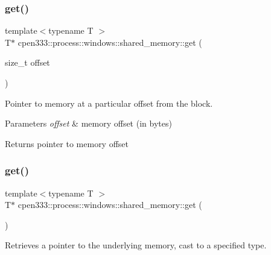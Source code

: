 \subsubsection{\texorpdfstring{get()}{get()}\hspace{0.1cm}{\footnotesize\ttfamily [2/3]}}
{\footnotesize\ttfamily template$<$typename T $>$ \\
T$\ast$ cpen333\+::process\+::windows\+::shared\+\_\+memory\+::get (\begin{DoxyParamCaption}\item[{size\+\_\+t}]{offset }\end{DoxyParamCaption})\hspace{0.3cm}{\ttfamily [inline]}}



Pointer to memory at a particular offset from the block. 


\begin{DoxyParams}{Parameters}
{\em offset} & memory offset (in bytes) \\
\hline
\end{DoxyParams}
\begin{DoxyReturn}{Returns}
pointer to memory offset 
\end{DoxyReturn}
\mbox{\label{classcpen333_1_1process_1_1windows_1_1shared__memory_a3986cdc917b26ab1ab608f59270a47c5}} 
\subsubsection{\texorpdfstring{get()}{get()}\hspace{0.1cm}{\footnotesize\ttfamily [3/3]}}
{\footnotesize\ttfamily template$<$typename T $>$ \\
T$\ast$ cpen333\+::process\+::windows\+::shared\+\_\+memory\+::get (\begin{DoxyParamCaption}{ }\end{DoxyParamCaption})\hspace{0.3cm}{\ttfamily [inline]}}



Retrieves a pointer to the underlying memory, cast to a specified type. 


